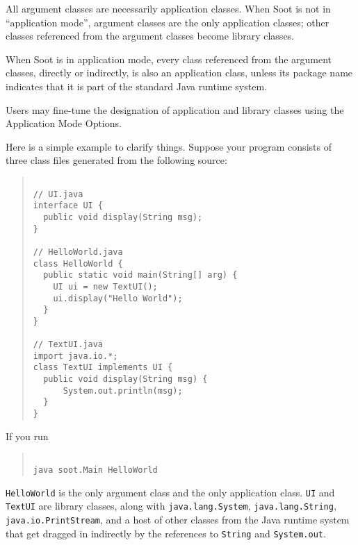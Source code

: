 \documentclass{article}
\begin{document}
\par

All argument classes are necessarily application classes.  When
Soot is not in ``application mode'', argument
classes are the only application classes; other classes
referenced from the argument classes become library classes.

\par

When Soot is in application mode, every class
referenced from the argument classes, directly or indirectly, is
also an application class, unless its package name indicates that
it is part of the standard Java runtime system.

\par

Users may fine-tune the designation of application and library
classes using the Application Mode Options.


\par

Here is a simple example to clarify things. Suppose your program
consists of three class files generated from the following
source:

\begin{quote}\begin{verbatim}

// UI.java
interface UI {
  public void display(String msg);
}

// HelloWorld.java
class HelloWorld {
  public static void main(String[] arg) {
    UI ui = new TextUI();
    ui.display("Hello World");
  }
}

// TextUI.java
import java.io.*;
class TextUI implements UI {
  public void display(String msg) {
      System.out.println(msg);
  }
}

\end{verbatim}\end{quote}


\par

If you run 

\begin{quote}\begin{verbatim}

java soot.Main HelloWorld

\end{verbatim}\end{quote}

{\tt HelloWorld} is the only argument class and the only
application class.  {\tt UI} and {\tt TextUI} are library
classes, along with {\tt java.lang.System},
{\tt java.lang.String}, {\tt java.io.PrintStream}, and a
host of other classes from the Java runtime system that get
dragged in indirectly by the references to {\tt String} and
{\tt System.out}.
\end{document}

